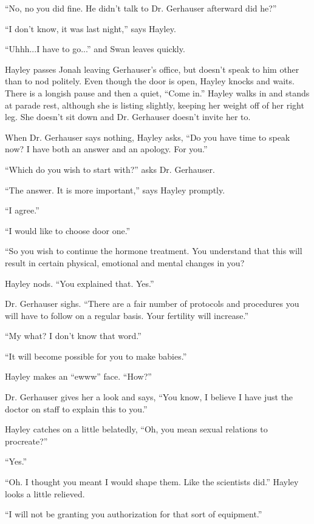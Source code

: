 ``No, no you did fine.  He didn't talk to Dr. Gerhauser afterward did he?''

``I don't know, it was last night,'' says Hayley.

``Uhhh...I have to go...'' and Swan leaves quickly.



Hayley passes Jonah leaving Gerhauser's office, but doesn't speak to him other than to nod politely.  Even though the door is open, Hayley knocks and waits.  There is a longish pause and then a quiet, ``Come in.''  Hayley walks in and stands at parade rest, although she is listing slightly, keeping her weight off of her right leg.  She doesn't sit down and Dr. Gerhauser doesn't invite her to.



When Dr. Gerhauser says nothing, Hayley asks, ``Do you have time to speak now?  I have both an answer and an apology.  For you.''

``Which do you wish to start with?'' asks Dr. Gerhauser.

``The answer.  It is more important,'' says Hayley promptly.

``I agree.''

``I would like to choose door one.''

``So you wish to continue the hormone treatment.  You understand that this will result in certain physical, emotional and mental changes in you?

Hayley nods.  ``You explained that.  Yes.''

Dr. Gerhauser sighs.  ``There are a fair number of protocols and procedures you will have to follow on a regular basis.  Your fertility will increase.''

``My what?  I don't know that word.''

``It will become possible for you to make babies.''

Hayley makes an ``ewww'' face.  ``How?''

Dr. Gerhauser gives her a look and says, ``You know, I believe I have just the doctor on staff to explain this to you.''

Hayley catches on a little belatedly, ``Oh, you mean sexual relations to procreate?''

``Yes.''

``Oh.  I thought you meant I would shape them.  Like the scientists did.''  Hayley looks a little relieved.

``I will not be granting you authorization for that sort of equipment.''


